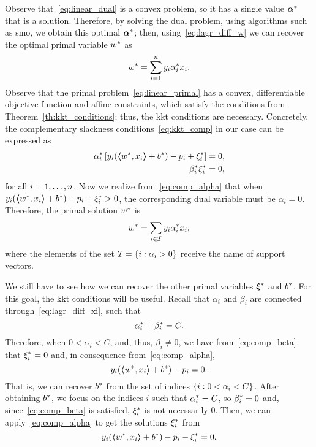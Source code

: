 %
Observe that~\eqref{eq:linear_dual} is a convex problem, so it has a single value ${\bm{\alpha}}^*$ that is a solution. Therefore, by solving the dual problem, using algorithms such as \acrshort{smo}, we obtain this optimal ${\bm{\alpha}}^*$; then, using~\eqref{eq:lagr_diff_w} we can recover the optimal primal variable ${w}^*$ as 
\begin{equation}
    \nonumber
    {w}^* = \sum_{i=1}^n y_i {\alpha}^*_i x_i .
\end{equation}
%
Observe that the primal problem~\eqref{eq:linear_primal} has a convex, differentiable objective function and affine constraints, which satisfy the conditions from Theorem~\ref{th:kkt_conditions}; thus, the \acrshort{kkt} conditions are necessary.
%
Concretely, the complementary slackness conditions~\eqref{eq:kkt_comp} in our case can be expressed as
\begin{align}
    \opt{\alpha}_i \left[ y_i (\dotp{\opt{w}}{x_i} + \opt{b}) - p_i + \opt{\xi}_i \right] = 0 , \label{eq:comp_alpha} \\
    \opt{\beta}_i \opt{\xi}_i = 0 , \label{eq:comp_beta}
\end{align}
for all $i=1, \ldots, n$. 
Now we realize from~\eqref{eq:comp_alpha} that when $y_i (\bm{\left\langle} {w}^*, x_i \bm{\right\rangle} + {b}^*) - p_i + {\xi}^*_i > 0$, the corresponding dual variable must be $\alpha_i = 0$. Therefore, the primal solution ${w}^*$ is 
\begin{equation}
    \nonumber
    {w}^* = \sum_{i \in \mathcal{I}} y_i {\alpha}^*_i x_i ,
\end{equation}
where the elements of the set $\mathcal{I} = \left\{i: \alpha_i > 0\right\}$ receive the name of support vectors.
%

We still have to see how we can recover the other primal variables ${\bm{\xi}}^*$ and ${b}^*$. For this goal, the \acrshort{kkt} conditions will be useful.
Recall that $\alpha_i$ and $\beta_i$ are connected through~\eqref{eq:lagr_diff_xi}, such that 
$$ {\alpha}^*_i + {\beta}^*_i = C .$$
Therefore, when $0 < \alpha_i < C$, and, thus, $\beta_i \neq 0$, we have from~\eqref{eq:comp_beta} that ${\xi}^*_i = 0$ and, in consequence from~\eqref{eq:comp_alpha},
\begin{equation}
    \nonumber
    y_i (\bm{\left\langle} {w}^*, x_i \bm{\right\rangle} + {b}^*) - p_i = 0 .
\end{equation}
That is, we can recover ${b}^*$ from the set of indices $\left\{i: 0 < \alpha_i < C\right\}$.
%
After obtaining ${b}^*$, we focus on the indices $i$ such that ${\alpha}^*_i = C$, so ${\beta}^*_i = 0$ and, since~\eqref{eq:comp_beta} is satisfied, ${\xi}^*_i$ is not necessarily $0$. Then, we can apply~\eqref{eq:comp_alpha} to get the solutions ${\xi}^*_i$ from 
\begin{equation}
    \nonumber
    y_i (\bm{\left\langle} {w}^*, x_i \bm{\right\rangle} + {b}^*) - p_i - {\xi}^*_i = 0 .
\end{equation}

